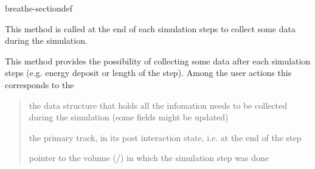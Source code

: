 \documentclass[letterpaper,10pt,english]{sphinxmanual}
\begin{document}
\begin{fulllineitems}
\begin{sphinxuseclass}{breathe-sectiondef}
\begin{fulllineitems}
\label{\detokenize{Simulation/SimulationCodeDoc:_CPPv4N12SteppingLoop14SteppingActionER7ResultsRK12G4HepEmTrackPK3Boxdiiii}}
\pysigstartsignatures
\pysigstartmultiline
{}
\pysigstopmultiline
\pysigstopsignatures
\sphinxAtStartPar
This method is called at the end of each simulation steps to collect some data during the simulation. 

\sphinxAtStartPar
This method provides the possibility of collecting some data after each simulation steps (e.g. energy deposit or length of the step). Among the  user actions this corresponds to the 

\sphinxAtStartPar
\begin{quote}\begin{description}
\sphinxAtStartPar
the data structure that holds all the infomation needs to be collected during the simulation (some fields might be updated) 

\sphinxAtStartPar
the primary track, in its post interaction state, i.e. at the end of the step 

\sphinxAtStartPar
pointer to the volume (/) in which the simulation step was done 


\end{description}
\end{quote}
\end{fulllineitems}
\end{sphinxuseclass}
\end{fulllineitems}
\end{document}
